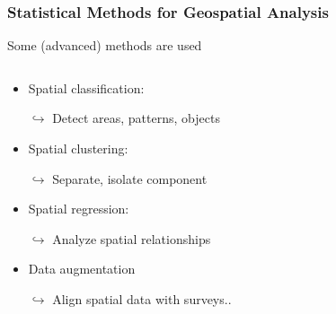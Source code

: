 \documentclass[xcolor=x11names,aspectratio=169, compress]{beamer}
\renewcommand{\(}{\begin{columns}}
\renewcommand{\)}{\end{columns}}
\newcommand{\<}[1]{\begin{column}{#1}}
\renewcommand{\>}{\end{column}}
\begin{document}
\begin{frame}
    \frametitle{Statistical Methods for Geospatial Analysis}
Some (advanced) methods are used
    \begin{columns}[T]
        \begin{column}{0.6\textwidth}
            \begin{itemize}[<+->]
            \item Spatial classification:
            \item[$\hookrightarrow$] Detect areas, patterns, objects
            \item Spatial clustering:
            \item[$\hookrightarrow$] Separate, isolate component
            \item Spatial regression:
            \item[$\hookrightarrow$] Analyze spatial relationships
            \item Data augmentation
            \item[$\hookrightarrow$] Align spatial data with surveys..


\end{itemize}
\end{column}
\end{columns}
\end{frame}
\end{document}
